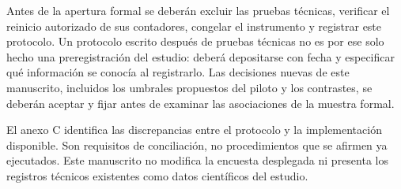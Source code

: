 \documentclass[12pt,letterpaper]{article}
\begin{document}
Antes de la apertura formal se deberán excluir las pruebas técnicas, verificar el reinicio autorizado de sus contadores, congelar el instrumento y registrar este protocolo. Un protocolo escrito después de pruebas técnicas no es por ese solo hecho una preregistración del estudio: deberá depositarse con fecha y especificar qué información se conocía al registrarlo. Las decisiones nuevas de este manuscrito, incluidos los umbrales propuestos del piloto y los contrastes, se deberán aceptar y fijar antes de examinar las asociaciones de la muestra formal.

El anexo C identifica las discrepancias entre el protocolo y la implementación disponible. Son requisitos de conciliación, no procedimientos que se afirmen ya ejecutados. Este manuscrito no modifica la encuesta desplegada ni presenta los registros técnicos existentes como datos científicos del estudio.
\end{document}
